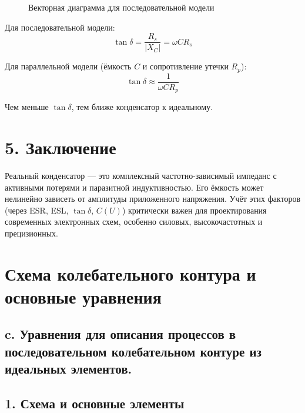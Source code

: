 \documentclass[a4paper]{article}
\begin{document}
\begin{figure}[h]
    \centering
    \caption{Векторная диаграмма для последовательной модели}
    \label{fig:vector}
\end{figure}

Для последовательной модели:
\[
\tan \delta = \frac{R_s}{|X_C|} = \omega C R_s
\]

Для параллельной модели (ёмкость \(C\) и сопротивление утечки \(R_p\)):
\[
\tan \delta \approx \frac{1}{\omega C R_p}
\]

Чем меньше \(\tan \delta\), тем ближе конденсатор к идеальному.

\section*{5. Заключение}

Реальный конденсатор — это комплексный частотно-зависимый импеданс с активными потерями и паразитной индуктивностью. Его ёмкость может нелинейно зависеть от амплитуды приложенного напряжения. Учёт этих факторов (через ESR, ESL, \(\tan \delta\), \(C(U)\)) критически важен для проектирования современных электронных схем, особенно силовых, высокочастотных и прецизионных.

\section{Схема колебательного контура и основные уравнения}
\subsection{c.	Уравнения для описания процессов в последовательном колебательном контуре из идеальных элементов.}

\subsection*{1. Схема и основные элементы}
\end{document}
